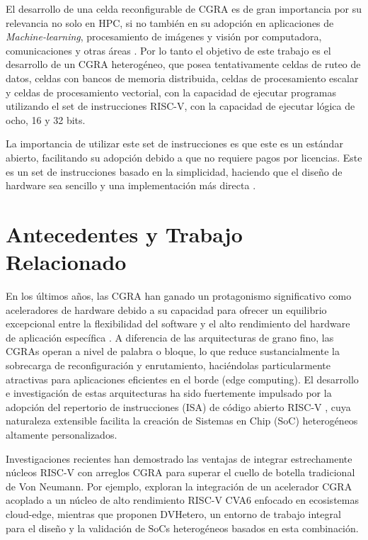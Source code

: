 \documentclass[conference]{IEEEtran}
\begin{document}
El desarrollo de una celda reconfigurable de CGRA es de gran importancia por su relevancia no solo en HPC, si no también en su adopción en aplicaciones de \textit{Machine-learning}, procesamiento de imágenes y visión por computadora, 
comunicaciones y otras áreas \cite{GuoweiZhu}. Por lo tanto el objetivo de este trabajo es el desarrollo de un CGRA heterogéneo, que posea tentativamente celdas de ruteo de datos,
celdas con bancos de memoria distribuida, celdas de procesamiento escalar y celdas de procesamiento vectorial, con la capacidad de ejecutar programas utilizando el set de instrucciones RISC-V, con la capacidad de ejecutar lógica de ocho, 16 y 32 bits.

La importancia de utilizar este set de instrucciones es que este es un estándar abierto, facilitando su adopción debido a que no requiere pagos por licencias. Este es un set de instrucciones basado en la simplicidad,
haciendo que el diseño de hardware sea sencillo y una implementación más directa \cite{riscv}.




\section{Antecedentes y Trabajo Relacionado}
En los últimos años, las CGRA han ganado un protagonismo significativo como aceleradores de hardware debido a su capacidad para ofrecer un equilibrio excepcional entre la flexibilidad del software y el alto rendimiento del hardware de aplicación específica \cite{LeiboLiu,Podobas}. A diferencia de las arquitecturas de grano fino, las CGRAs operan a nivel de palabra o bloque, lo que reduce sustancialmente la sobrecarga de reconfiguración y enrutamiento, haciéndolas particularmente atractivas para aplicaciones eficientes en el borde (edge computing). El desarrollo e investigación de estas arquitecturas ha sido fuertemente impulsado por la adopción del repertorio de instrucciones (ISA) de código abierto RISC-V \cite{riscv}, cuya naturaleza extensible facilita la creación de Sistemas en Chip (SoC) heterogéneos altamente personalizados.

Investigaciones recientes han demostrado las ventajas de integrar estrechamente núcleos RISC-V con arreglos CGRA para superar el cuello de botella tradicional de Von Neumann. Por ejemplo, \cite{granja} exploran la integración de un acelerador CGRA acoplado a un núcleo de alto rendimiento RISC-V CVA6 enfocado en ecosistemas cloud-edge, mientras que \cite{GuoweiZhu} proponen DVHetero, un entorno de trabajo integral para el diseño y la validación de SoCs heterogéneos basados en esta combinación. 
\end{document}
